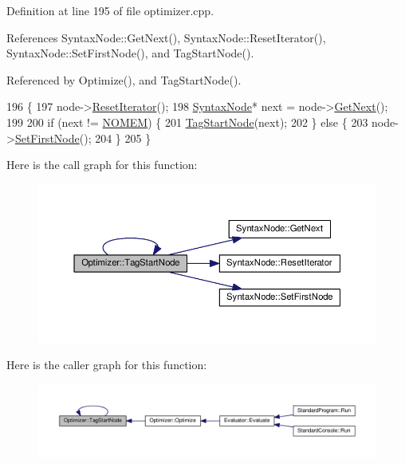 Definition at line 195 of file optimizer.\+cpp.



References Syntax\+Node\+::\+Get\+Next(), Syntax\+Node\+::\+Reset\+Iterator(), Syntax\+Node\+::\+Set\+First\+Node(), and Tag\+Start\+Node().



Referenced by Optimize(), and Tag\+Start\+Node().


\begin{DoxyCode}
196 \{
197     node->\hyperlink{classSyntaxNode_ac51307368fb255aa760b99e137178c89}{ResetIterator}();
198     \hyperlink{classSyntaxNode}{SyntaxNode}* next = node->\hyperlink{classSyntaxNode_af1fa46ba30aa4f2affa2d4e96a4be010}{GetNext}();
199 
200     \textcolor{keywordflow}{if} (next != \hyperlink{platform_8h_a46ff2bfbf0d44b8466a2251d5bd5e6f8}{NOMEM}) \{
201         \hyperlink{classOptimizer_a2b71012237663dc9459a908fba6fbecc}{TagStartNode}(next);
202     \} \textcolor{keywordflow}{else} \{
203         node->\hyperlink{classSyntaxNode_a24e2d5b5e94a67ce55cea52cd48212e6}{SetFirstNode}();
204     \}
205 \}
\end{DoxyCode}


Here is the call graph for this function\+:\nopagebreak
\begin{figure}[H]
\begin{center}
\leavevmode
\includegraphics[width=350pt]{classOptimizer_a2b71012237663dc9459a908fba6fbecc_cgraph}
\end{center}
\end{figure}




Here is the caller graph for this function\+:\nopagebreak
\begin{figure}[H]
\begin{center}
\leavevmode
\includegraphics[width=350pt]{classOptimizer_a2b71012237663dc9459a908fba6fbecc_icgraph}
\end{center}
\end{figure}




